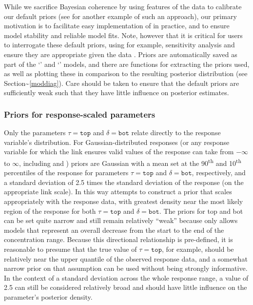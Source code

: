 \documentclass[
  shortnames]{jss}
\newcommand{\cls}[1]{`\code{#1}'}
\begin{document}
While we sacrifice Bayesian coherence by using features of the data to calibrate our default priors (see \citet{chipman2010} for another example of such an approach), our primary motivation is to facilitate easy implementation of  in practice, and to ensure model stability and reliable model fits. Note, however that it is critical for users to interrogate these default priors, using for example, sensitivity analysis \citep{depaoli2020importance} and ensure they are appropriate given the data \citep{gelman2017entropy}. Priors are automatically saved as part of the \cls{brmsfit} and \cls{bayesnecfit} models, and there are functions for extracting the priors used, as well as plotting these in comparison to the resulting posterior distribution (see Section\textasciitilde{}\ref{moddiag}). Care should be taken to ensure that the default priors are sufficiently weak such that they have little influence on posterior estimates.

\hypertarget{priors-for-response-scaled-parameters}{%
\subsubsection{Priors for response-scaled parameters}\label{priors-for-response-scaled-parameters}}

Only the parameters \(\tau = \mathtt{top}\) and \(\delta = \mathtt{bot}\) relate directly to the response variable's distribution. For Gaussian-distributed responses (or any response variable for which the link ensures valid values of the response can take from \(-\infty\) to \(\infty\), including  and ) priors are Gaussian with a mean set at the 90\textsuperscript{th} and 10\textsuperscript{th} percentiles of the response for parameters \(\tau = \mathtt{top}\) and \(\delta = \mathtt{bot}\), respectively, and a standard deviation of 2.5 times the standard deviation of the response (on the appropriate link scale). In this way  attempts to construct a prior that scales appropriately with the response data, with greatest density near the most likely region of the response for both \(\tau = \mathtt{top}\) and \(\delta = \mathtt{bot}\). The priors for top and bot can be set quite narrow and still remain relatively ``weak'' because  only allows models that represent an overall decrease from the start to the end of the concentration range. Because this directional relationship is pre-defined, it is reasonable to presume that the true value of \(\tau = \mathtt{top}\), for example, should be relatively near the upper quantile of the observed response data, and a somewhat narrow prior on that assumption can be used without being strongly informative. In the context of a standard deviation across the whole response range, a value of 2.5 can still be considered relatively broad and should have little influence on the parameter's posterior density.
\end{document}
